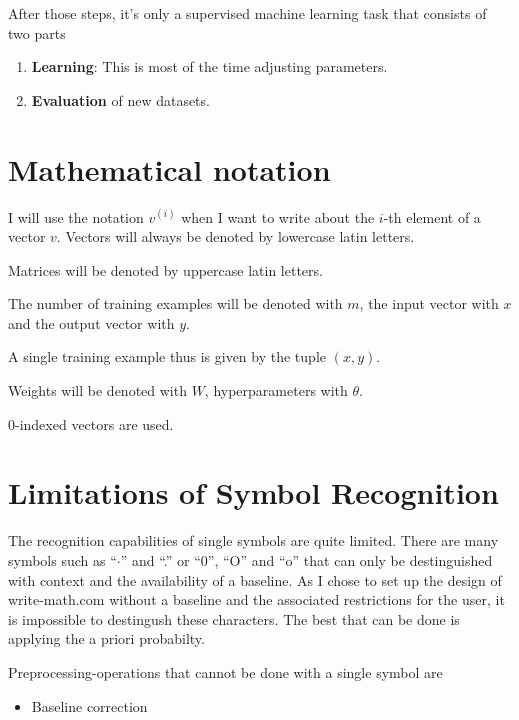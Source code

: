 After those steps, it's only a supervised machine learning task that consists of
two parts

\begin{enumerate}
    \item \textbf{Learning}: This is most of the time adjusting parameters.
    \item \textbf{Evaluation} of new datasets.
\end{enumerate}

\section{Mathematical notation}
I will use the notation $v^{(i)}$ when I want to write about the $i$-th element
of a vector $v$. Vectors will always be denoted by lowercase latin letters.

Matrices will be denoted by uppercase latin letters.

The number of training examples will be denoted with $m$, the input vector with
$x$ and the output vector with $y$.

A single training example thus is given by the tuple $(x, y)$.

Weights will be denoted with $W$, hyperparameters with $\theta$.

0-indexed vectors are used.

\section{Limitations of Symbol Recognition}
The recognition capabilities of single symbols are quite limited. There are
many symbols such as \enquote{$\cdot$} and \enquote{.} or \enquote{0}, \enquote{O}
and \enquote{o} that can only be destinguished with context and the availability
of a baseline. As I chose to set up the design of write-math.com without a
baseline and the associated %
restrictions for the user, it is impossible to destingush these characters.
The best that can be done is applying the a priori probabilty.

Preprocessing-operations that cannot be done with a single symbol are

\begin{itemize}
    \item Baseline correction
\end{itemize}